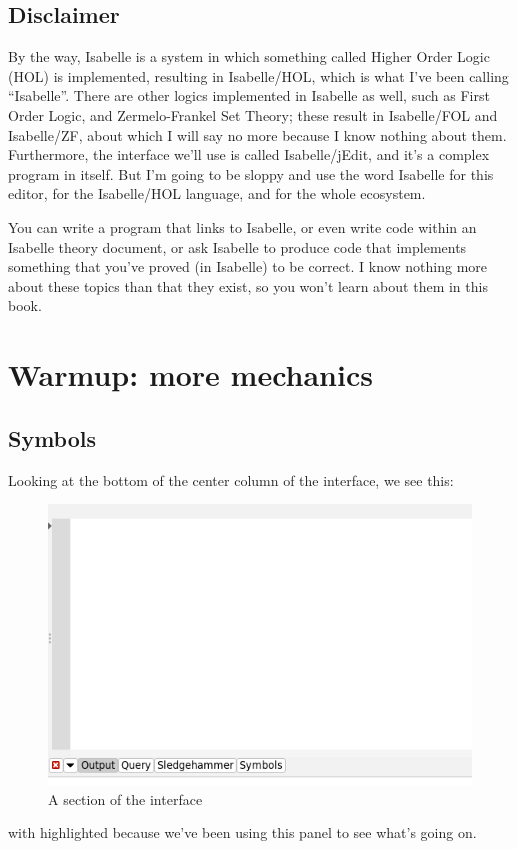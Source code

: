 \subsection*{Disclaimer}
By the way, Isabelle is a system in which something called Higher Order Logic (HOL) is implemented, resulting in Isabelle/HOL, which is what I've been calling ``Isabelle''. There are other logics implemented in Isabelle as well, such as First Order Logic, and Zermelo-Frankel Set Theory; these result in Isabelle/FOL and Isabelle/ZF, about which I will say no more because I know nothing about them. Furthermore, the interface we'll use is called Isabelle/jEdit, and it's a complex program in itself. But I'm going to be sloppy and use the word Isabelle for this editor, for the Isabelle/HOL language, and for the whole ecosystem. 

You can write a program that links to Isabelle, or even write code within an Isabelle theory document, or ask Isabelle to produce code that implements something that you've proved (in Isabelle) to be correct. I know nothing more about these topics than that they exist, so you won't learn about them in this book. 

\section{Warmup: more mechanics}
\subsection{Symbols}
Looking at the bottom of the center column of the interface, we see this:
\begin{figure} [h]
    \centering
    \includegraphics[width=0.5\linewidth]{TEXT//C02//Images/image.png}
    \caption{A section of the interface}
    \label{fig:interface-section}
\end{figure}
\noindent
with  highlighted because we've been using this panel to see what's going on. 


